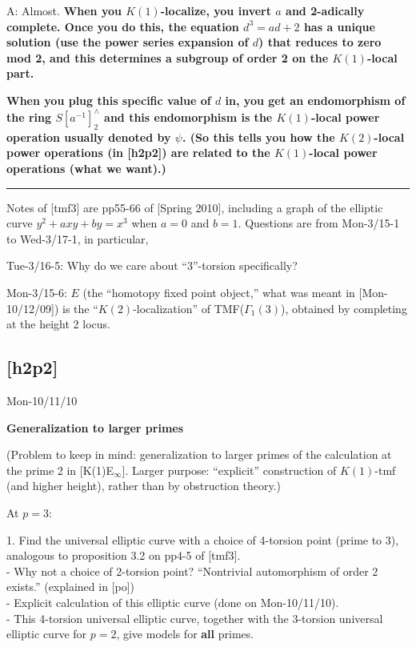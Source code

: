 \documentclass{rs}
\theoremstyle{definition}
\theoremstyle{remark}
\renewcommand{\=}{\approx}
\renewcommand{\-}{\sim}
\numberwithin{equation}{section}
\numberwithin{thm}{section}
\begin{document}
A: Almost. \textbf{When you $K(1)$-localize, you invert $a$ and 2-adically complete. 
Once you do this, the equation $d^3 = ad+2$ has a unique solution (use the power series expansion of $d$) 
that reduces to zero mod 2, and this determines a subgroup of order 2 on the $K(1)$-local part.}

\textbf{When you plug this specific value of $d$ in, you get an endomorphism of the ring $S[a^{-1}]^{\wedge}_2$ 
and this endomorphism is the $K(1)$-local power operation usually denoted by $\psi$. 
(So this tells you how the $K(2)$-local power operations (in [h2p2]) are related to the $K(1)$-local power operations (what we want).)}\\

\hrule

Notes of [tmf3] are pp55-66 of [Spring 2010], including a graph of the elliptic curve  $y^2 + axy + by = x^3$ when $a = 0$ and $b = 1$. 
Questions are from Mon-3/15-1 to Wed-3/17-1, in particular,

Tue-3/16-5: Why do we care about ``3''-torsion specifically?

Mon-3/15-6: $E$ (the ``homotopy fixed point object,'' what was meant in [Mon-10/12/09]) 
is the ``$K(2)$-localization'' of TMF($\Gamma_1(3)$), obtained by completing at the height 2 locus.


\newpage
\subsection{[h2p2]}
\label{subsec:h2p2}

Mon-10/11/10

\textbf{Generalization to larger primes}

(Problem to keep in mind: generalization to larger primes of the calculation at the prime 2 in [K(1)E$_\infty$]. 
Larger purpose: ``explicit'' construction of $K(1)$-tmf (and higher height), rather than by obstruction theory.)

At $p = 3$:

1. Find the universal elliptic curve with a choice of 4-torsion point (prime to 3), analogous to proposition 3.2 on pp4-5 of [tmf3].\\
- Why not a choice of 2-torsion point? ``Nontrivial automorphism of order 2 exists.'' (explained in [po])\\
- Explicit calculation of this elliptic curve (done on Mon-10/11/10).\\
- This 4-torsion universal elliptic curve, together with the 3-torsion universal elliptic curve for $p=2$, give models for \textbf{all} primes.
\end{document}

